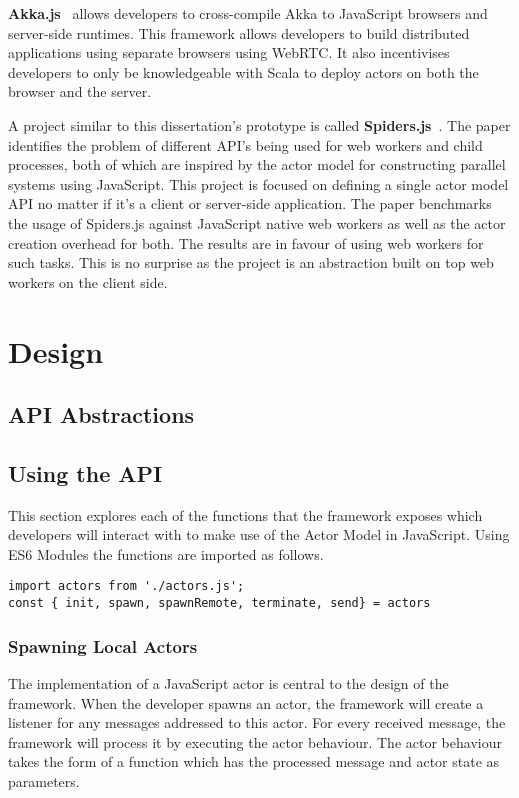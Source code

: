 \documentclass[12pt, a4paper]{report}
\theoremstyle{definition}
\theoremstyle{definition}%
\theoremstyle{definition}%
\theoremstyle{definition}%
\theoremstyle{definition}%
\theoremstyle{definition}%
\begin{document}
\textbf{Akka.js}~\cite{stivan2015akka} allows developers to cross-compile Akka to JavaScript browsers and server-side runtimes. This framework allows developers to build distributed applications using separate browsers using WebRTC. It also incentivises developers to only be knowledgeable with Scala to deploy actors on both the browser and the server.

A project similar to this dissertation's prototype is called \textbf{Spiders.js}~\cite{spidersjs}. The paper identifies the problem of different API's being used for web workers and child processes, both of which are inspired by the actor model for constructing parallel systems using JavaScript. This project is focused on defining a single actor model API no matter if it's a client or server-side application. The paper benchmarks the usage of Spiders.js against JavaScript native web workers as well as the actor creation overhead for both. The results are in favour of using web workers for such tasks. This is no surprise as the project is an abstraction built on top web workers on the client side.


\chapter{Design}
\section{API Abstractions}
\section{Using the API}
This section explores each of the functions that the framework exposes which developers will interact with to make use of the Actor Model in JavaScript. Using ES6 Modules the functions are imported as follows.
\begin{lstlisting}
import actors from './actors.js';
const { init, spawn, spawnRemote, terminate, send} = actors
\end{lstlisting}
\subsection{Spawning Local Actors}
The implementation of a JavaScript actor is central to the design of the framework. When the developer spawns an actor, the framework will create a listener for any messages addressed to this actor. For every received message, the framework will process it by executing the actor behaviour. The actor behaviour takes the form of a function which has the processed message and actor state as parameters.
\end{document}
